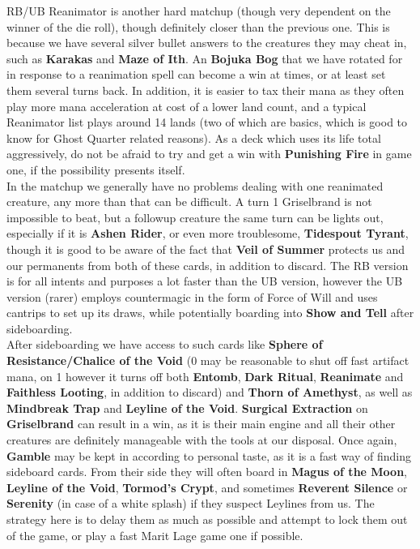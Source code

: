 \documentclass{report}
\begin{document}
RB/UB Reanimator is another hard matchup (though very dependent on the winner of the die roll), though definitely closer than the previous one. This is because we have several silver bullet answers to the creatures they may cheat in, such as \textbf{Karakas} and \textbf{Maze of Ith}. An \textbf{Bojuka Bog} that we have rotated for in response to a reanimation spell can become a win at times, or at least set them several turns back. In addition, it is easier to tax their mana as they often play more mana acceleration at cost of a lower land count, and a typical Reanimator list plays around 14 lands (two of which are basics, which is good to know for Ghost Quarter related reasons). As a deck which uses its life total aggressively, do not be afraid to try and get a win with \textbf{Punishing Fire} in game one, if the possibility presents itself.\\ In the matchup we generally have no problems dealing with one reanimated creature, any more than that can be difficult. A turn 1 Griselbrand is not impossible to beat, but a followup creature the same turn can be lights out, especially if it is \textbf{Ashen Rider}, or even more troublesome, \textbf{Tidespout Tyrant}, though it is good to be aware of the fact that \textbf{Veil of Summer} protects us and our permanents from both of these cards, in addition to discard. The RB version is for all intents and purposes a lot faster than the UB version, however the UB version (rarer) employs countermagic in the form of Force of Will and uses cantrips to set up its draws, while potentially boarding into \textbf{Show and Tell} after sideboarding.\\ After sideboarding we have access to such cards like \textbf{Sphere of Resistance/Chalice of the Void} (0 may be reasonable to shut off fast artifact mana, on 1 however it turns off both \textbf{Entomb}, \textbf{Dark Ritual}, \textbf{Reanimate} and \textbf{Faithless Looting}, in addition to discard) and \textbf{Thorn of Amethyst}, as well as \textbf{Mindbreak Trap} and \textbf{Leyline of the Void}. \textbf{Surgical Extraction} on \textbf{Griselbrand} can result in a win, as it is their main engine and all their other creatures are definitely manageable with the tools at our disposal. Once again, \textbf{Gamble} may be kept in according to personal taste, as it is a fast way of finding sideboard cards. From their side they will often board in \textbf{Magus of the Moon}, \textbf{Leyline of the Void}, \textbf{Tormod's Crypt}, and sometimes \textbf{Reverent Silence} or \textbf{Serenity} (in case of a white splash) if they suspect Leylines from us. The strategy here is to delay them as much as possible and attempt to lock them out of the game, or play a fast Marit Lage game one if possible.\\\\
\end{document}
